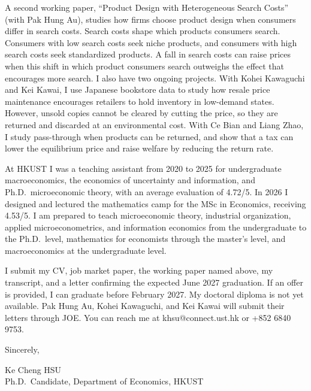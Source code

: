 \documentclass[11pt]{article}
\begin{document}
A second working paper, ``Product Design with Heterogeneous Search Costs'' (with Pak Hung Au), studies how firms choose product design when consumers differ in search costs. Search costs shape which products consumers search. Consumers with low search costs seek niche products, and consumers with high search costs seek standardized products. A fall in search costs can raise prices when this shift in which product consumers search outweighs the effect that encourages more search. I also have two ongoing projects. With Kohei Kawaguchi and Kei Kawai, I use Japanese bookstore data to study how resale price maintenance encourages retailers to hold inventory in low-demand states. However, unsold copies cannot be cleared by cutting the price, so they are returned and discarded at an environmental cost. With Ce Bian and Liang Zhao, I study pass-through when products can be returned, and show that a tax can lower the equilibrium price and raise welfare by reducing the return rate.

At HKUST I was a teaching assistant from 2020 to 2025 for undergraduate macroeconomics, the economics of uncertainty and information, and Ph.D.\ microeconomic theory, with an average evaluation of 4.72/5. In 2026 I designed and lectured the mathematics camp for the MSc in Economics, receiving 4.53/5. I am prepared to teach microeconomic theory, industrial organization, applied microeconometrics, and information economics from the undergraduate to the Ph.D.\ level, mathematics for economists through the master's level, and macroeconomics at the undergraduate level.

I submit my CV, job market paper, the working paper named above, my transcript, and a letter confirming the expected June 2027 graduation. If an offer is provided, I can graduate before February 2027. My doctoral diploma is not yet available. Pak Hung Au, Kohei Kawaguchi, and Kei Kawai will submit their letters through JOE. You can reach me at khsu@connect.ust.hk or +852 6840 9753.

\vspace{0.25em}
Sincerely,

\vspace{0.25em}
Ke Cheng HSU \\
Ph.D.\ Candidate, Department of Economics, HKUST
\end{document}
